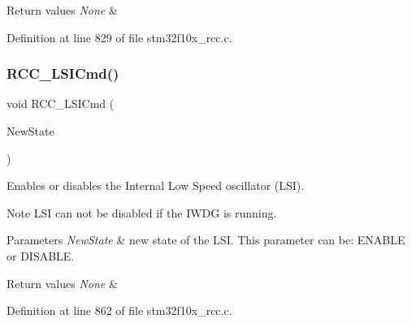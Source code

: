 \begin{DoxyRetVals}{Return values}
{\em None} & \\
\hline
\end{DoxyRetVals}


Definition at line 829 of file stm32f10x\+\_\+rcc.\+c.

\mbox{\label{group___r_c_c___exported___functions_ga81e3ca29fd154ac2019bba6936d6d5ed}} 
\subsubsection{\texorpdfstring{R\+C\+C\+\_\+\+L\+S\+I\+Cmd()}{RCC\_LSICmd()}}
{\footnotesize\ttfamily void R\+C\+C\+\_\+\+L\+S\+I\+Cmd (\begin{DoxyParamCaption}\item[{\hyperlink{group___exported__types_gac9a7e9a35d2513ec15c3b537aaa4fba1}{Functional\+State}}]{New\+State }\end{DoxyParamCaption})}



Enables or disables the Internal Low Speed oscillator (L\+SI). 

\begin{DoxyNote}{Note}
L\+SI can not be disabled if the I\+W\+DG is running. 
\end{DoxyNote}

\begin{DoxyParams}{Parameters}
{\em New\+State} & new state of the L\+SI. This parameter can be\+: E\+N\+A\+B\+LE or D\+I\+S\+A\+B\+LE. \\
\hline
\end{DoxyParams}

\begin{DoxyRetVals}{Return values}
{\em None} & \\
\hline
\end{DoxyRetVals}


Definition at line 862 of file stm32f10x\+\_\+rcc.\+c.

\mbox{\label{group___r_c_c___exported___functions_ga8f62b86c6ca8ae6585ba1cec79431fe5}} 
